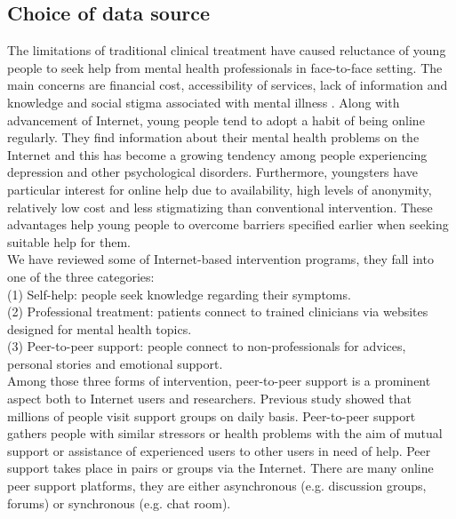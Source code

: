 \subsection*{Choice of data source}
The limitations of traditional clinical treatment have caused reluctance of young people to seek help from mental health professionals in face-to-face setting. The main concerns are financial cost, accessibility of services, lack of information and knowledge and social stigma associated with mental illness \cite{Rickwood2005}. Along with advancement of Internet, young people tend to adopt a habit of being online regularly. They find information about their mental health problems on the Internet and this has become a growing tendency among people experiencing depression and other psychological disorders. Furthermore, youngsters have particular interest for online help due to availability, high levels of anonymity, relatively low cost and less stigmatizing than conventional intervention. These advantages help young people to overcome barriers specified earlier when seeking suitable help for them.\\
We have reviewed some of Internet-based intervention programs, they fall into one of the three categories: \\
(1) Self-help: people seek knowledge regarding their symptoms. \\
(2) Professional treatment: patients connect to trained clinicians via websites designed for mental health topics. \\
(3) Peer-to-peer support: people connect to non-professionals for advices, personal stories and emotional support.\\

Among those three forms of intervention, peer-to-peer support is a prominent aspect both to Internet users and researchers. Previous study showed that millions of people visit support groups on daily basis. Peer-to-peer support gathers people with similar stressors or health problems with the aim of mutual support or assistance of experienced users to other users in need of help. Peer support takes place in pairs or groups via the Internet. There are many online peer support platforms, they are either asynchronous (e.g. discussion groups, forums) or synchronous (e.g. chat room).\\

